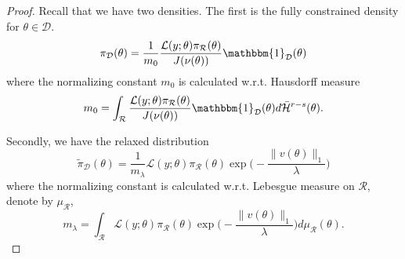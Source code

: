 \documentclass[10pt,fleqn]{article} \pdfoutput=1
\DeclareMathOperator{\1}{\mathbbm{1}} \DeclareMathOperator{\bigO}{\mc O}
\begin{document}
\begin{proof} Recall that we have two densities. The first is the fully
	constrained density for $\theta\in\mathcal{D}$.  \begin{equation*}
		\pi_\mathcal{D}(\theta) = \frac{1}{m_0}
		\frac{\mathcal{L}(y;\theta)\pi_\mathcal{R}(\theta)}{J(\nu(\theta))}\mathbbm{1}_\mathcal{D}(\theta)
	\end{equation*} where the normalizing constant $m_0$ is calculated
	w.r.t. Hausdorff measure $$m_0 = \int_\mathcal{R}
		\frac{\mathcal{L}(y;\theta)\pi_\mathcal{R}(\theta)}{J(\nu(\theta))}\mathbbm{1}_\mathcal{D}(\theta)d\bar{\mathcal{H}}^{r-s}(\theta).$$

	Secondly, we have the relaxed distribution
	$$\tilde{\pi}_\mathcal{D}(\theta) = \frac{1}{m_\lambda}
		\mathcal{L}(y;\theta)\pi_\mathcal{R}(\theta)\exp\bigg(-\frac{\|v(\theta)\|_1}{\lambda}\bigg)$$
	where the normalizing constant is calculated w.r.t. Lebesgue measure on
	$\mathcal{R}$, denote by $\mu_\mathcal{R}$, $$m_\lambda =
		\int_\mathcal{R}\mathcal{L}(y;\theta)\pi_\mathcal{R}(\theta)\exp\bigg(-\frac{\|v(\theta)\|_1}{\lambda}\bigg)
		d\mu_\mathcal{R}(\theta).$$



\end{proof}
\end{document}
